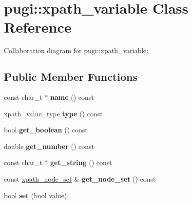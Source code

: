\hypertarget{classpugi_1_1xpath__variable}{}\section{pugi\+:\+:xpath\+\_\+variable Class Reference}
\label{classpugi_1_1xpath__variable}


Collaboration diagram for pugi\+:\+:xpath\+\_\+variable\+:
\subsection*{Public Member Functions}
\begin{DoxyCompactItemize}
\item 
\hypertarget{classpugi_1_1xpath__variable_adfee2f69aadd5a9fd36ba67ea9f11c9c}{}const char\+\_\+t $\ast$ {\bfseries name} () const \label{classpugi_1_1xpath__variable_adfee2f69aadd5a9fd36ba67ea9f11c9c}

\item 
\hypertarget{classpugi_1_1xpath__variable_a33713853d1298ce11fb382258ffe11d4}{}xpath\+\_\+value\+\_\+type {\bfseries type} () const \label{classpugi_1_1xpath__variable_a33713853d1298ce11fb382258ffe11d4}

\item 
\hypertarget{classpugi_1_1xpath__variable_a2d562014ddb3c9f0a2d6b8f36f3adc36}{}bool {\bfseries get\+\_\+boolean} () const \label{classpugi_1_1xpath__variable_a2d562014ddb3c9f0a2d6b8f36f3adc36}

\item 
\hypertarget{classpugi_1_1xpath__variable_aad1197f1eecb6072794389eb997d539a}{}double {\bfseries get\+\_\+number} () const \label{classpugi_1_1xpath__variable_aad1197f1eecb6072794389eb997d539a}

\item 
\hypertarget{classpugi_1_1xpath__variable_ab6c9175201e43003c5abcdd3bc426bbf}{}const char\+\_\+t $\ast$ {\bfseries get\+\_\+string} () const \label{classpugi_1_1xpath__variable_ab6c9175201e43003c5abcdd3bc426bbf}

\item 
\hypertarget{classpugi_1_1xpath__variable_aa82f2112e66c7745066788068a14f8f5}{}const \hyperlink{classpugi_1_1xpath__node__set}{xpath\+\_\+node\+\_\+set} \& {\bfseries get\+\_\+node\+\_\+set} () const \label{classpugi_1_1xpath__variable_aa82f2112e66c7745066788068a14f8f5}

\item 
\hypertarget{classpugi_1_1xpath__variable_a1e6ee8876fba9f01373df452416e48fb}{}bool {\bfseries set} (bool value)\label{classpugi_1_1xpath__variable_a1e6ee8876fba9f01373df452416e48fb}


\end{DoxyCompactItemize}
